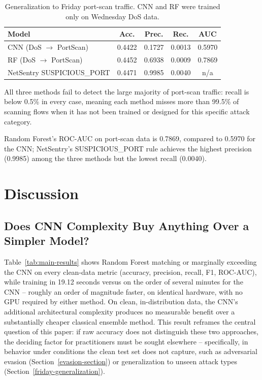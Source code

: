 \documentclass[conference]{IEEEtran}
\begin{document}
\begin{table}[htbp]
\caption{Generalization to Friday port-scan traffic. CNN and RF were trained only on Wednesday DoS data.}
\begin{center}
\begin{tabular}{lcccc}
\toprule
\textbf{Model} & \textbf{Acc.} & \textbf{Prec.} & \textbf{Rec.} & \textbf{AUC} \\
\midrule
CNN (DoS $\rightarrow$ PortScan) & 0.4422 & 0.1727 & 0.0013 & 0.5970 \\
RF (DoS $\rightarrow$ PortScan) & 0.4452 & 0.6938 & 0.0009 & 0.7869 \\
NetSentry SUSPICIOUS\_PORT & 0.4471 & 0.9985 & 0.0040 & n/a \\
\bottomrule
\end{tabular}
\label{tab:friday-results}
\end{center}
\end{table}
 
All three methods fail to detect the large majority of port-scan traffic: recall is below 0.5\% in every case, meaning each method misses more than 99.5\% of scanning flows when it has not been trained or designed for this specific attack category.
 
Random Forest's ROC-AUC on port-scan data is 0.7869, compared to 0.5970 for the CNN; NetSentry's SUSPICIOUS\_PORT rule achieves the highest precision (0.9985) among the three methods but the lowest recall (0.0040).
 
\section{Discussion}
\label{discussion-section}
\subsection{Does CNN Complexity Buy Anything Over a Simpler Model?}
 
Table~\ref{tab:main-results} shows Random Forest matching or marginally exceeding the CNN on every clean-data metric (accuracy, precision, recall, F1, ROC-AUC), while training in 19.12 seconds versus on the order of several minutes for the CNN -- roughly an order of magnitude faster, on identical hardware, with no GPU required by either method. On clean, in-distribution data, the CNN's additional architectural complexity produces no measurable benefit over a substantially cheaper classical ensemble method. This result reframes the central question of this paper: if raw accuracy does not distinguish these two approaches, the deciding factor for practitioners must be sought elsewhere -- specifically, in behavior under conditions the clean test set does not capture, such as adversarial evasion (Section~\ref{evasion-section}) or generalization to unseen attack types (Section~\ref{friday-generalization}).
 
\end{document}
